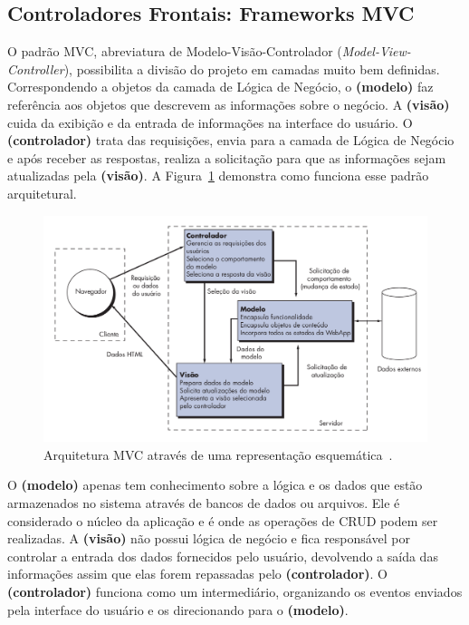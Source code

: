 \subsection{Controladores Frontais: Frameworks MVC}
\label{sec-ref-framework-mvc}

O padrão MVC, abreviatura de Modelo-Visão-Controlador (\textit{Model-View-Controller}), possibilita a divisão do projeto em camadas muito bem definidas. Correspondendo a objetos da camada de Lógica de Negócio, o \textbf{(modelo)} faz referência aos objetos que descrevem as informações sobre o negócio. A \textbf{(visão)} cuida da exibição e da entrada de informações na interface do usuário. O \textbf{(controlador)} trata das requisições, envia para a camada de Lógica de Negócio e após receber as respostas, realiza a solicitação para que as informações sejam atualizadas pela \textbf{(visão)}. A Figura~\ref{fig-ref-mvc} demonstra como funciona esse padrão arquitetural.  

\begin{figure}[h]
	\centering
	\includegraphics[scale=.45]{figuras/fig-ref-mvc} 
	\caption{Arquitetura MVC através de uma representação esquemática~\cite{pressman:es11}.}
	\label{fig-ref-mvc}
\end{figure}

O \textbf{(modelo)} apenas tem conhecimento sobre a lógica e os dados que estão armazenados no sistema através de bancos de dados ou arquivos. Ele é considerado o núcleo da aplicação e é onde as operações de CRUD podem ser realizadas. A \textbf{(visão)} não possui lógica de negócio e fica responsável por controlar a entrada dos dados fornecidos pelo usuário, devolvendo a saída das informações assim que elas forem repassadas pelo \textbf{(controlador)}. O \textbf{(controlador)} funciona como um intermediário, organizando os eventos enviados pela interface do usuário e os direcionando para o \textbf{(modelo)}.

